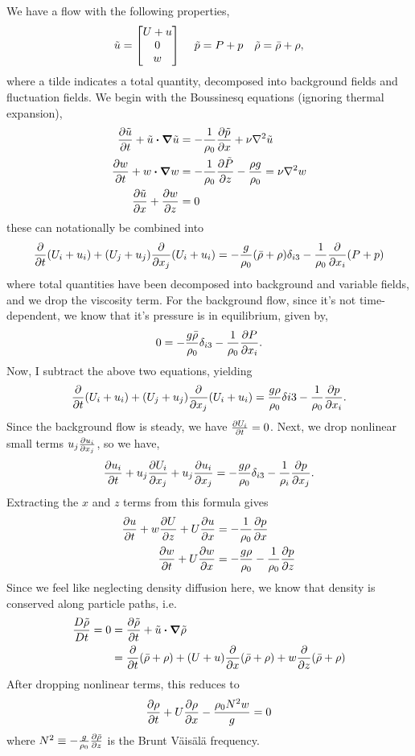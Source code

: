\documentclass[10pt]{article}
\begin{document}
We have a flow with the following properties,
\[\tilde{u} = \mqty[U + u \\ 0 \\ w]\ \quad \tilde{p} = P + p \quad \tilde\rho = \bar\rho + \rho,\]
where a tilde indicates a total quantity, decomposed into background fields and fluctuation fields. We begin with the Boussinesq equations (ignoring thermal expansion),
\begin{align}
    \pdv{\tilde{u}}{t} + \tilde{u}\vdot\grad\tilde{u} & = -\frac{1}{\rho_0}\pdv{\tilde{p}}{x} + \nu\laplacian\tilde{u} \\
    \pdv{w}{t} + w\vdot\grad w & = -\frac{1}{\rho_0}\pdv{\tilde{P}}{z} - \frac{\rho g}{\rho_0} = \nu\laplacian w \\
    \pdv{\tilde{u}}{x} + \pdv{w}{z} & = 0
\end{align}
these can notationally be combined into
\begin{align}
    \pdv{t}(U_i + u_i) + (U_j + u_j)\pdv{x_j}(U_i + u_i) = -\frac{g}{\rho_0}(\bar\rho + \rho)\delta_{i3} - \frac{1}{\rho_0}\pdv{x_i}(P + p)
\end{align}
where total quantities have been decomposed into background and variable fields, and we drop the viscosity term. For the background flow, since it's not time-dependent, we know that it's pressure is in equilibrium, given by,
\begin{align}
    0 = -\frac{g\bar\rho}{\rho_0}\delta_{i3} - \frac{1}{\rho_0}\pdv{P}{x_i}.
\end{align}
Now, I subtract the above two equations, yielding
\begin{align}
    \pdv{t}(U_i + u_i) + (U_j + u_j)\pdv{x_j}(U_i + u_i) = \frac{g\rho}{\rho_0}\delta{i3} - \frac{1}{\rho_0}\pdv{p}{x_i}.
\end{align}
Since the background flow is steady, we have $\pdv{U_i}{t} = 0$. Next, we drop nonlinear small terms $u_j\pdv{u_i}{x_j}$, so we have,
\begin{align}
    \pdv{u_i}{t} + u_j\pdv{U_i}{x_j} + u_j\pdv{u_i}{x_j} = -\frac{g\rho}{\rho_0}\delta_{i3} - \frac{1}{\rho_i}\pdv{p}{x_j}.
\end{align}
Extracting the $x$ and $z$ terms from this formula gives
\begin{align}
    \pdv{u}{t} + w\pdv{U}{z} + U\pdv{u}{x} & = -\frac{1}{\rho_0}\pdv{p}{x} \\
    \pdv{w}{t} + U\pdv{w}{x} & = -\frac{g\rho}{\rho_0} - \frac{1}{\rho_0}\pdv{p}{z}
\end{align}
Since we feel like neglecting density diffusion here, we know that density is conserved along particle paths, i.e.
\begin{align}
    \frac{D\tilde\rho}{Dt} = 0 & = \pdv{\tilde\rho}{t} + \tilde{u}\vdot\grad\tilde\rho \\
                               & = \pdv{t}(\bar\rho + \rho) + (U + u)\pdv{x}(\bar\rho + \rho) + w\pdv{z}(\bar\rho + \rho)
\end{align}
After dropping nonlinear terms, this reduces to
\begin{align}
    \pdv{\rho}{t} + U\pdv{\rho}{x} - \frac{\rho_0N^2w}{g} = 0
\end{align}
where $N^2 \equiv -\frac{g}{\rho_0}\pdv{\bar\rho}{z}$ is the Brunt V\"ais\"al\"a frequency.
\end{document}
